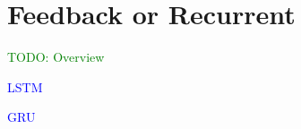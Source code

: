 \section{Feedback or Recurrent}

\textcolor{green}{TODO: Overview}


\textcolor{blue}{LSTM}

\textcolor{blue}{GRU}